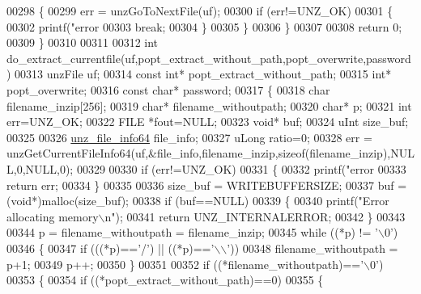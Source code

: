 \begin{DoxyCode}
{{{{{{{00298         \{
00299             err = unzGoToNextFile(uf);
00300             \textcolor{keywordflow}{if} (err!=UNZ\_OK)
00301             \{
00302                 printf(\textcolor{stringliteral}{"error %
00303                 \textcolor{keywordflow}{break};
00304             \}
00305         \}
00306     \}
00307 
00308     \textcolor{keywordflow}{return} 0;
00309 \}
00310 
00311 
00312 \textcolor{keywordtype}{int} do\_extract\_currentfile(uf,popt\_extract\_without\_path,popt\_overwrite,password)
00313     unzFile uf;
00314     \textcolor{keyword}{const} \textcolor{keywordtype}{int}* popt\_extract\_without\_path;
00315     \textcolor{keywordtype}{int}* popt\_overwrite;
00316     \textcolor{keyword}{const} \textcolor{keywordtype}{char}* password;
00317 \{
00318     \textcolor{keywordtype}{char} filename\_inzip[256];
00319     \textcolor{keywordtype}{char}* filename\_withoutpath;
00320     \textcolor{keywordtype}{char}* p;
00321     \textcolor{keywordtype}{int} err=UNZ\_OK;
00322     FILE *fout=NULL;
00323     \textcolor{keywordtype}{void}* buf;
00324     uInt size\_buf;
00325 
00326     \hyperlink{structunz__file__info64__s}{unz\_file\_info64} file\_info;
00327     uLong ratio=0;
00328     err = unzGetCurrentFileInfo64(uf,&file\_info,filename\_inzip,\textcolor{keyword}{sizeof}(filename\_inzip),NULL,0,NULL,0);
00329 
00330     \textcolor{keywordflow}{if} (err!=UNZ\_OK)
00331     \{
00332         printf(\textcolor{stringliteral}{"error %
00333         \textcolor{keywordflow}{return} err;
00334     \}
00335 
00336     size\_buf = WRITEBUFFERSIZE;
00337     buf = (\textcolor{keywordtype}{void}*)malloc(size\_buf);
00338     \textcolor{keywordflow}{if} (buf==NULL)
00339     \{
00340         printf(\textcolor{stringliteral}{"Error allocating memory\(\backslash\)n"});
00341         \textcolor{keywordflow}{return} UNZ\_INTERNALERROR;
00342     \}
00343 
00344     p = filename\_withoutpath = filename\_inzip;
00345     \textcolor{keywordflow}{while} ((*p) != \textcolor{charliteral}{'\(\backslash\)0'})
00346     \{
00347         \textcolor{keywordflow}{if} (((*p)==\textcolor{charliteral}{'/'}) || ((*p)==\textcolor{charliteral}{'\(\backslash\)\(\backslash\)'}))
00348             filename\_withoutpath = p+1;
00349         p++;
00350     \}
00351 
00352     \textcolor{keywordflow}{if} ((*filename\_withoutpath)==\textcolor{charliteral}{'\(\backslash\)0'})
00353     \{
00354         \textcolor{keywordflow}{if} ((*popt\_extract\_without\_path)==0)
00355         \{
}}}}}}}}}
\end{DoxyCode}
